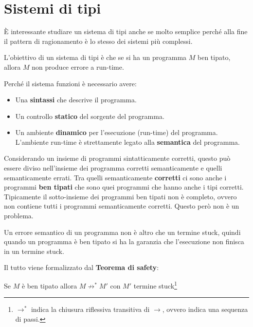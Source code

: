 


\section{Sistemi di tipi}

\`E interessante studiare un sistema di tipi anche se molto semplice perché alla fine il pattern di ragionamento è lo stesso dei sistemi più complessi.

L'obiettivo di un sistema di tipi è che se si ha un programma $M$ ben tipato, allora $M$ non produce errore a run-time.

Perché il sistema funzioni è necessario avere:

\begin{itemize}
	\item Una \textbf{sintassi} che descrive il programma.
	\item Un controllo \textbf{statico} del sorgente del programma.
	\item Un ambiente \textbf{dinamico} per l'esecuzione (run-time) del programma. L'ambiente run-time è strettamente legato alla \textbf{semantica} del programma.
\end{itemize}

\noindent Considerando un insieme di programmi sintatticamente corretti, questo può essere diviso nell'insieme dei programma corretti semanticamente e quelli semanticamente errati. Tra quelli semanticamente \textbf{corretti} ci sono anche i programmi \textbf{ben tipati} che sono quei programmi che hanno anche i tipi corretti. Tipicamente il sotto-insieme dei programmi ben tipati non è completo, ovvero non contiene tutti i programmi semanticamente corretti. Questo però non è un problema.

Un errore semantico di un programma non è altro che un termine stuck, quindi quando un programma è ben tipato si ha la garanzia che l'esecuzione non finisca in un termine stuck.

Il tutto viene formalizzato dal \textbf{Teorema di safety}:

\begin{center}
	Se $M$ è ben tipato allora $M \not\rightarrow^* M'$ con $M'$ termine stuck\footnote{$\rightarrow^*$ indica la chiusura riflessiva transitiva di $\rightarrow$, ovvero indica una sequenza di passi.}
\end{center}

